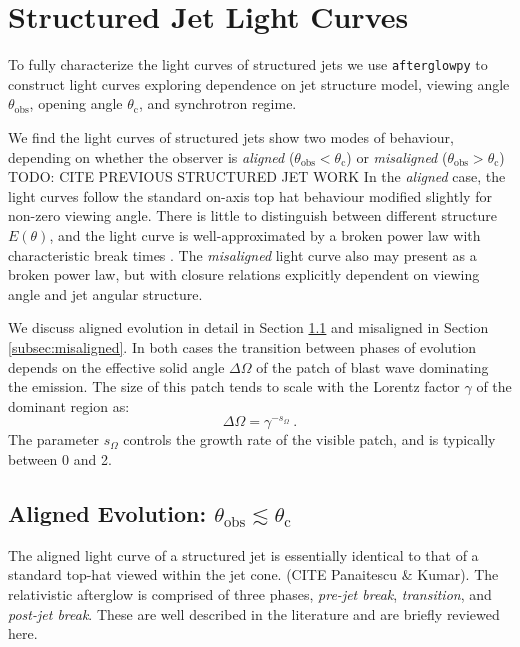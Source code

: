 \documentclass[twocolumn]{aastex62}
\newcommand{\afterglowpy}{{\tt afterglowpy}}
\newcommand{\thobs}{\ensuremath{\theta_{\mathrm{obs}}}}
\newcommand{\thC}{\ensuremath{\theta_{\mathrm{c}}}}
\newcommand{\som}{\ensuremath{s_{\Omega}}}
\begin{document}
\section{Structured Jet Light Curves}\label{sec:structuredJets}

To fully characterize the light curves of structured jets we use \afterglowpy{} to construct light curves exploring dependence on jet structure model, viewing angle $\thobs$, opening angle $\thC$, and synchrotron regime.  

We find the light curves of structured jets show two modes of behaviour, depending on whether the observer is \emph{aligned} ($\thobs < \thC$) or \emph{misaligned} ($\thobs > \thC$) TODO: CITE PREVIOUS STRUCTURED JET WORK
 In the \emph{aligned} case, the light curves follow the standard on-axis top hat behaviour modified slightly for non-zero viewing angle.  There is little to distinguish between different structure $E(\theta)$, and the light curve is well-approximated by a broken power law with characteristic break times \citep{Granot:2002aa}.  The \emph{misaligned} light curve also may present as a broken power law, but with closure relations explicitly dependent on viewing angle and jet angular structure.  

We discuss aligned evolution in detail in Section \ref{subsec:aligned} and misaligned in Section \ref{subsec:misaligned}.  In both cases the transition between phases of evolution depends on the effective solid angle $\Delta \Omega$ of the patch of blast wave dominating the emission.  The size of this patch tends to scale with the Lorentz factor $\gamma$ of the dominant region as:
\begin{equation}
	\Delta \Omega = \gamma^{-\som} \ .
\end{equation}
The parameter $\som$ controls the growth rate of the visible patch, and is typically between 0 and 2. 

\subsection{Aligned Evolution: $\thobs \lesssim \thC$} \label{subsec:aligned}

The aligned light curve of a structured jet is essentially identical to that of a standard top-hat viewed within the jet cone. (CITE Panaitescu \& Kumar).  The relativistic afterglow is comprised of three phases, \emph{pre-jet break}, \emph{transition}, and \emph{post-jet break}.  These are well described in the literature and are briefly reviewed here.
\end{document}

